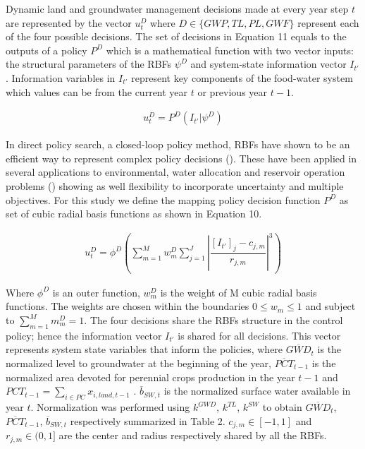 \documentclass[11pt,a4paper]{article}
\begin{document}
Dynamic land and groundwater management decisions made at every year step $t$ are represented by the vector $u_{t}^D$ where $D \in \{GWP,TL,PL,GWF\}$ represent each of the four possible decisions. The set of decisions in Equation 11 equals to the outputs of a policy $P^D$ which is a mathematical function with two vector inputs: the structural parameters of the RBFs $\psi^D$ and system-state information vector $I_{t'}$. Information variables in $I_{t'}$ represent key components of the food-water system which values can be from the current year $t$ or previous year $t-1$. 

\begin{align}
u_{t}^D = P^{D}(I_{t'}|\psi^{D})
\end{align}

In direct policy search, a closed-loop policy method, RBFs have shown to be an efficient way to represent complex policy decisions (\cite{busoniu_cross-entropy_2011}). These have been applied in several applications to environmental, water allocation and reservoir operation problems (\cite{giuliani_universal_2014,gupta_can_2020,quinn_direct_2017,garner_using_2018, zatarain_salazar_balancing_2017}) showing as well flexibility to incorporate uncertainty and multiple objectives. For this study we define the mapping policy decision function $P^D$ as set of cubic radial basis functions as shown in Equation 10.

\begin{align}
u_{t}^D = \phi^{D}\left(\sum_{m=1}^M w_{m}^D \sum_{j=1}^J \left\lvert\dfrac{[I_{t'}]_{j}-c_{j,m}}{r_{j,m}}\right\rvert^{3}\right)
\end{align}

Where $\phi^{D}$ is an outer function, $w_{m}^D$ is the weight of M cubic radial basis functions. The weights are chosen within the boundaries $ 0 \leq w_{m} \leq 1$ and subject to $\sum_{m=1}^M m_{m}^D= 1$. The four decisions share the RBFs structure in the control policy; hence the information vector $I_{t'}$ is shared for all decisions. This vector represents system state variables that inform the policies, where $\overline{GWD}_{t}$ is the normalized level to groundwater at the beginning of the year, $\overline{PCT}_{t-1}$ is the normalized area devoted for perennial crops production in the year $t-1$ and $PCT_{t-1}=\sum_{i \in PC}x_{i,land,t-1}$ . $\overline{b}_{SW,t}$ is the normalized surface water available in year $t$. Normalization was performed using $k^{GWD}$, $k^{TL}$, $k^{SW}$ to obtain $\overline{GWD}_{t}$, $\overline{PCT}_{t-1}$, $\overline{b}_{SW,t}$ respectively summarized in Table 2. $c_{j,m} \in [-1,1]$ and $r_{j,m} \in (0,1]$ are the center and radius respectively shared by all the RBFs.
\end{document}
